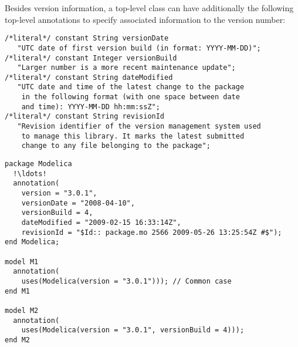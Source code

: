 Besides version information, a top-level class can have additionally the following top-level annotations to specify associated information to the version number:%
\begin{lstlisting}[language=modelica]
/*literal*/ constant String versionDate
   "UTC date of first version build (in format: YYYY-MM-DD)";
/*literal*/ constant Integer versionBuild
   "Larger number is a more recent maintenance update";
/*literal*/ constant String dateModified
   "UTC date and time of the latest change to the package
    in the following format (with one space between date
    and time): YYYY-MM-DD hh:mm:ssZ";
/*literal*/ constant String revisionId
   "Revision identifier of the version management system used
    to manage this library. It marks the latest submitted
    change to any file belonging to the package";
\end{lstlisting}%

\begin{example}
\begin{lstlisting}[language=modelica,mathescape=false,escapechar=!]
package Modelica
  !\ldots!
  annotation(
    version = "3.0.1",
    versionDate = "2008-04-10",
    versionBuild = 4,
    dateModified = "2009-02-15 16:33:14Z",
    revisionId = "$Id:: package.mo 2566 2009-05-26 13:25:54Z #$");
end Modelica;

model M1
  annotation(
    uses(Modelica(version = "3.0.1"))); // Common case
end M1

model M2
  annotation(
    uses(Modelica(version = "3.0.1", versionBuild = 4)));
end M2
\end{lstlisting}
\end{example}

